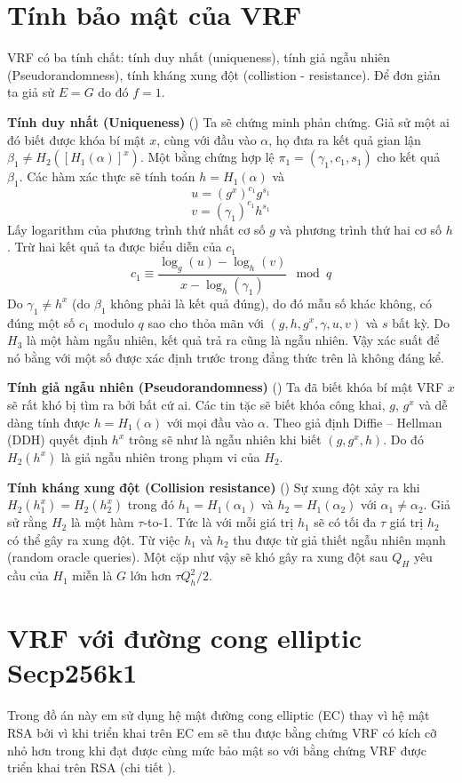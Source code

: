 \documentclass[../main.tex]{subfiles}
\begin{document}
\section{Tính bảo mật của VRF}
VRF có ba tính chất: tính duy nhất (uniqueness), tính giả ngẫu nhiên (Pseudorandomness), tính kháng xung đột (collistion - resistance).
Để đơn giản ta giả sử $E = G$ do đó $f =1$.

\textbf{Tính duy nhất (Uniqueness)} (\hspace{1sp}\cite{chainlink}) Ta sẽ chứng minh phản chứng. Giả sử một ai đó biết được khóa bí mật $x$, cùng với đầu vào $\alpha$, họ đưa ra kết quả gian lận $\beta_1\neq H_2([H_1(\alpha)]^x)$. Một bằng chứng hợp lệ $\pi_1 = (\gamma_1,c_1,s_1)$ cho kết quả $\beta_1$. Các hàm xác thực sẽ tính toán $h = H_1(\alpha)$ và 
$$ u = (g^x)^{c_1}g^{s_1}
$$
$$ v = (\gamma_1)^{c_1}h^{s_1}
$$
Lấy logarithm của phương trình thứ nhất cơ số $g$ và phương trình thứ hai cơ số $h$. Trừ hai kết quả ta được biểu diễn của $c_1$
$$c_1 \equiv \frac{\log_g(u) - \log_h(v)}{x-\log_h(\gamma_1)}\mod q
$$
Do $\gamma_1 \neq h^x$ (do $\beta_1$ không phải là kết quả đúng), do đó mẫu số khác không, có đúng một số $c_1$ modulo $q$ sao cho thỏa mãn với $(g,h,g^x,\gamma,u,v)$ và $s$ bất kỳ. Do $H_3$ là một hàm ngẫu nhiên, kết quả trả ra cũng là ngẫu nhiên. Vậy xác suất để nó bằng với một số được xác định trước trong đẳng thức trên là không đáng kể. 

\textbf{Tính giả ngẫu nhiên (Pseudorandomness)} (\hspace{1sp}\cite{chainlink}) Ta đã biết khóa bí mật VRF $x$ sẽ rất khó bị tìm ra bởi bất cứ ai. Các tin tặc sẽ biết khóa công khai, $g$, $g^x$ và dễ dàng tính được $h = H_1(\alpha)$ với mọi đầu vào $\alpha$. Theo giả định Diffie – Hellman (DDH) quyết định $h^x$ trông sẽ như là ngẫu nhiên khi biết $(g,g^x,h)$. Do đó $H_2(h^x)$ là giả ngẫu nhiên trong phạm vi của $H_2$.

\textbf{Tính kháng xung đột (Collision resistance)} (\hspace{1sp}\cite{chainlink}) Sự xung đột xảy ra khi $H_2(h_1^x) = H_2(h_2^x)$ trong đó $h_1 = H_1(\alpha_1)$ và $h_2 = H_1(\alpha_2)$ với $\alpha_1 \neq \alpha_2$. 
Giả sử rằng $H_2$ là một hàm $\tau$-to-1. Tức là với mỗi giá trị $h_1$ sẽ có tối đa $\tau$ giá trị $h_2$ có thể gây ra xung đột. Từ việc $h_1$ và $h_2$ thu được từ giả thiết ngẫu nhiên mạnh (random oracle queries). Một cặp như vậy sẽ khó gây ra xung đột sau $Q_H$ yêu cầu của $H_1$ miễn là $G$ lớn hơn $\tau Q_h^2 /2$.


\section{VRF với đường cong elliptic Secp256k1}
Trong đồ án này em sử dụng hệ mật đường cong elliptic (EC) thay vì hệ mật RSA bởi vì khi triển khai trên EC em sẽ thu được bằng chứng VRF có kích cỡ nhỏ hơn trong khi đạt được cùng mức bảo mật so với bằng chứng VRF được triển khai trên RSA (chi tiết \cite{papadopoulos2017making}).
\end{document}
